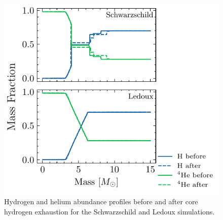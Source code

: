 \documentclass[twocolumn,fontsize=11pt]{scrartcl}
\begin{document}
\begin{figure}
    \centering
    \includegraphics{q34hydrogen_exhausted.pdf}
    \caption{Hydrogen and helium abundance profiles before and after core hydrogen exhaustion for the Schwarzschild and Ledoux simulations.}
    \label{fig:q34hydrogen_exhausted}   
\end{figure}

\printbibliography
\end{document}
